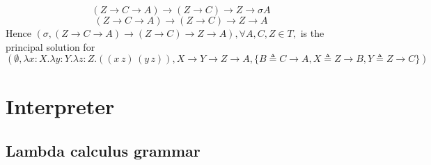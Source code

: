 \documentclass[8pt]{beamer}
\begin{document}
\begin{frame}
\begin{overprint}
        \begin{displaymath}
            (Z\rightarrow C\rightarrow A) \rightarrow (Z\rightarrow C) 
            \rightarrow Z\rightarrow \sigma A
        \end{displaymath}
        \begin{displaymath}
            (Z\rightarrow C\rightarrow A) \rightarrow (Z\rightarrow C) 
            \rightarrow Z\rightarrow  A
        \end{displaymath}
        Hence $(\sigma,             (Z\rightarrow C\rightarrow A)
        \rightarrow (Z\rightarrow C) \rightarrow Z\rightarrow  A),
        \forall A,C,Z\in T,$ is the principal solution for 
        \begin{displaymath}    
                (\emptyset, \lambda x:X. \lambda y:Y.
            \lambda z:Z.  ((x\, z)\, (y \, z)), X \rightarrow
                Y \rightarrow Z\rightarrow A, \{B\triangleq
                C\rightarrow A, X 
                                        \triangleq  Z \rightarrow B, Y
                                        \triangleq  Z
                                                                \rightarrow
                                                                C\})
        \end{displaymath}
    \end{overprint}
\end{frame}

\section{Interpreter}

\subsection{Lambda calculus grammar}
\end{document}
